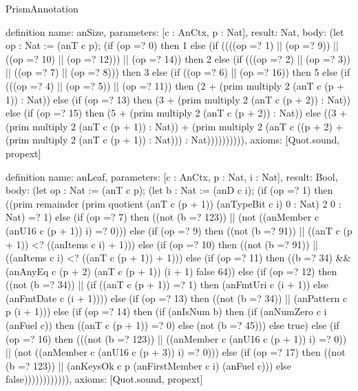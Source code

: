 \begin{lexlean}{PrismAnnotation}
\begin{semanticmodule}
definition{
  name: anSize,
  parameters: [c : AnCtx, p : Nat],
  result: Nat,
  body: (let op : Nat := (anT c p); (if (op =? 0) then 1 else (if ((((op =? 1) || (op =? 9)) || ((op =? 10) || (op =? 12))) || (op =? 14)) then 2 else (if (((op =? 2) || (op =? 3)) || ((op =? 7) || (op =? 8))) then 3 else (if ((op =? 6) || (op =? 16)) then 5 else (if (((op =? 4) || (op =? 5)) || (op =? 11)) then (2 + (prim multiply 2 (anT c (p + 1)) : Nat)) else (if (op =? 13) then (3 + (prim multiply 2 (anT c (p + 2)) : Nat)) else (if (op =? 15) then (5 + (prim multiply 2 (anT c (p + 2)) : Nat)) else ((3 + (prim multiply 2 (anT c (p + 1)) : Nat)) + (prim multiply 2 (anT c ((p + 2) + (prim multiply 2 (anT c (p + 1)) : Nat))) : Nat)))))))))),
  axioms: [Quot.sound, propext]
}

definition{
  name: anLeaf,
  parameters: [c : AnCtx, p : Nat, i : Nat],
  result: Bool,
  body: (let op : Nat := (anT c p); (let b : Nat := (anD c i); (if (op =? 1) then ((prim remainder (prim quotient (anT c (p + 1)) (anTypeBit c i) 0 : Nat) 2 0 : Nat) =? 1) else (if (op =? 7) then ((not (b =? 123)) || (not ((anMember c (anU16 c (p + 1)) i) =? 0))) else (if (op =? 9) then ((not (b =? 91)) || ((anT c (p + 1)) <? ((anItems c i) + 1))) else (if (op =? 10) then ((not (b =? 91)) || ((anItems c i) <? ((anT c (p + 1)) + 1))) else (if (op =? 11) then ((b =? 34) && (anAnyEq c (p + 2) (anT c (p + 1)) (i + 1) false 64)) else (if (op =? 12) then ((not (b =? 34)) || (if ((anT c (p + 1)) =? 1) then (anFmtUri c (i + 1)) else (anFmtDate c (i + 1)))) else (if (op =? 13) then ((not (b =? 34)) || (anPattern c p (i + 1))) else (if (op =? 14) then (if (anIsNum b) then (if (anNumZero c i (anFuel c)) then ((anT c (p + 1)) =? 0) else (not (b =? 45))) else true) else (if (op =? 16) then (((not (b =? 123)) || ((anMember c (anU16 c (p + 1)) i) =? 0)) || (not ((anMember c (anU16 c (p + 3)) i) =? 0))) else (if (op =? 17) then ((not (b =? 123)) || (anKeysOk c p (anFirstMember c i) (anFuel c))) else false)))))))))))),
  axioms: [Quot.sound, propext]
}


\end{semanticmodule}
\end{lexlean}
